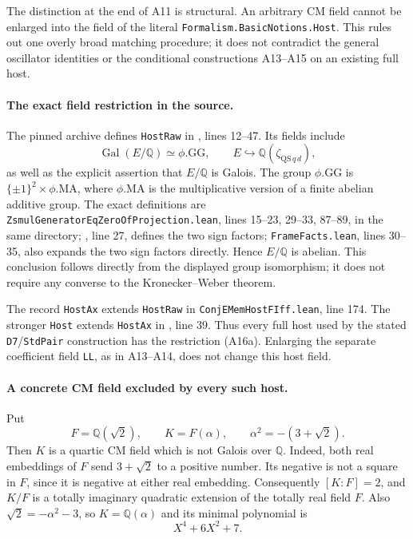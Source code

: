 \documentclass[11pt]{article}
\newcommand{\Q}{\mathbb Q}\newcommand{\C}{\mathbb C}\newcommand{\Z}{\mathbb Z}\newcommand{\R}{\mathbb R}\newcommand{\A}{\mathbb A}\newcommand{\OO}{\mathcal O}
\theoremstyle{definition}\newtheorem{definition}[theorem]{Definition}\newtheorem{remark}[theorem]{Remark}
\begin{document}
The distinction at the end of A11 is structural. An arbitrary
CM field cannot be enlarged into the field of the literal
\nolinkurl{Formalism.BasicNotions.Host}. This rules out one
overly broad matching procedure; it does not contradict the
general oscillator identities or the conditional constructions
A13--A15 on an existing full host.

\paragraph{The exact field restriction in the source.}
The pinned archive defines \texttt{HostRaw} in
,
lines 12--47. Its fields include
\[
 \operatorname{Gal}(E/\Q)\simeq\phi.\mathrm{GG},
 \qquad
 E\hookrightarrow\Q(\zeta_{\mathrm{QS}\,q\,d}),
 \tag{A16a}
\]
as well as the explicit assertion that $E/\Q$ is Galois.
The group $\phi.\mathrm{GG}$ is
$\{\pm1\}^2\times\phi.\mathrm{MA}$, where
$\phi.\mathrm{MA}$ is the multiplicative version of a finite
abelian additive group. The exact definitions are
\nolinkurl{ZsmulGeneratorEqZeroOfProjection.lean},
lines 15--23, 29--33, 87--89, in the same directory;
,
line 27, defines the two sign factors;
\texttt{FrameFacts.lean}, lines 30--35, also expands the
two sign factors directly. Hence $E/\Q$ is abelian.
This conclusion follows directly from the displayed group
isomorphism; it does not require any converse to the
Kronecker--Weber theorem.

The record \texttt{HostAx} extends \texttt{HostRaw} in
\texttt{ConjEMemHostFIff.lean}, line 174. The stronger
\texttt{Host} extends \texttt{HostAx} in
,
line 39. Thus every full host used by the stated
\texttt{D7}/\texttt{StdPair} construction has the restriction
(A16a). Enlarging the separate coefficient field
\texttt{LL}, as in A13--A14, does not change this host field.

\paragraph{A concrete CM field excluded by every such host.}
Put
\[
 F=\Q(\sqrt2),\qquad
 K=F(\alpha),\qquad
 \alpha^2=-(3+\sqrt2).
 \tag{A16b}
\]
Then $K$ is a quartic CM field which is not Galois over
$\Q$. Indeed, both real embeddings of $F$ send
$3+\sqrt2$ to a positive number. Its negative is not
a square in $F$, since it is negative at either real
embedding. Consequently $[K:F]=2$, and $K/F$ is a
totally imaginary quadratic extension of the totally
real field $F$. Also $\sqrt2=-\alpha^2-3$, so
$K=\Q(\alpha)$ and its minimal polynomial is
\[
                     X^4+6X^2+7.
 \tag{A16c}
\]
\end{document}

